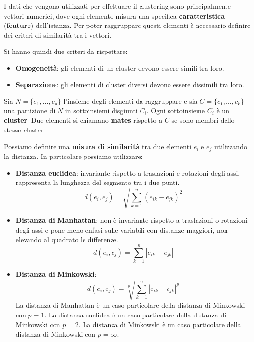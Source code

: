 I dati che vengono utilizzati per effettuare il clustering sono principalmente
vettori numerici, dove ogni elemento misura una specifica \textbf{caratteristica}
(\textbf{feature}) dell'istanza. Per poter raggruppare questi elementi è necessario
definire dei criteri di similarità tra i vettori.

Si hanno quindi due criteri da rispettare:
\begin{itemize}
    \item \textbf{Omogeneità}: gli elementi di un cluster devono essere simili tra loro.
    \item \textbf{Separazione}: gli elementi di cluster diversi devono essere
          dissimili tra loro.
\end{itemize}
\begin{definizione}
    Sia $N = \{e_1, \dots, e_n\}$ l'insieme degli elementi da raggruppare e sia
    $C = \{c_1, \dots, c_k\}$ una partizione di $N$ in sottoinsiemi disgiunti
    $C_i$. Ogni sottoinsieme $C_i$ è un \textbf{cluster}. Due elementi si chiamano
    \textbf{mates} rispetto a $C$ se sono membri dello stesso cluster.
\end{definizione}
\begin{definizione}
    Possiamo definire una \textbf{misura di similarità} tra due elementi $e_i$ e
    $e_j$ utilizzando la distanza. In particolare possiamo utilizzare:
    \begin{itemize}
        \item \textbf{Distanza euclidea}: invariante rispetto a traslazioni e
              rotazioni degli assi, rappresenta la lunghezza del segmento tra i
              due punti.
              \begin{equation}
                  d(e_i, e_j) = \sqrt{\sum_{k=1}^n (e_{ik} - e_{jk})^2}
              \end{equation}
        \item \textbf{Distanza di Manhattan}: non è invariante rispetto a traslazioni
              o rotazioni degli assi e pone meno enfasi sulle variabili
              con distanze maggiori, non elevando al quadrato le differenze.
              \begin{equation}
                  d(e_i, e_j) = \sum_{k=1}^n |e_{ik} - e_{jk}|
              \end{equation}
        \item \textbf{Distanza di Minkowski}:
              \begin{equation}
                  d(e_i, e_j) = \sqrt[p]{\sum_{k=1}^n |e_{ik} - e_{jk}|^p}
              \end{equation}
              La distanza di Manhattan è un caso particolare della distanza di
              Minkowski con $p=1$. La distanza euclidea è un caso particolare della
              distanza di Minkowski con $p=2$. La distanza di Minkowski è un caso
              particolare della distanza di Minkowski con $p=\infty$.
    \end{itemize}
\end{definizione}

